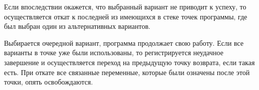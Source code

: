 Если впоследствии окажется, что выбранный вариант не приводит к успеху, то осуществляется откат к последней из имеющихся в стеке точек программы, где был выбран один из альтернативных вариантов.

Выбирается очередной вариант, программа продолжает свою работу. Если все варианты в точке уже были использованы, то регистрируется неудачное завершение и осуществляется переход на предыдущую точку возврата, если такая есть. При откате все связанные переменные, которые были означены после этой точки, опять освобождаются.

